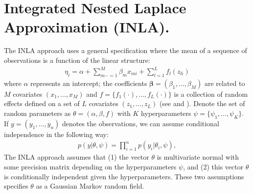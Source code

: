 \documentclass[11pt]{amsart}
\theoremstyle{plain}
\theoremstyle{definition}
\theoremstyle{remark}
\begin{document}
\section{Integrated Nested Laplace Approximation (INLA).}
\label{sec:inla}

The INLA approach uses a general specification where the mean of a sequence of
observations is a function of the linear structure:
\begin{align*}
  \eta_i = \alpha +\sum_{m-=1}^M\beta_mx_{mi}+\sum_{l=1}^Lf_l(z_{li})
\end{align*}
where $\alpha$ represents an intercept; the coefficients
$\mathbf{\beta} = (\beta_1,\ldots,\beta_M)$ are related to $M$ covariates
$(x_1,\ldots,x_M)$ and $f = \{f_1(\cdot),\ldots,f_L(\cdot)\}$ is a collection of
random effects defined on a set of $L$ covariates $(z_1,\ldots,z_L)$ (see
\cite{Rue2009} and \cite{Blangiardo2013}). Denote the set of random parameters as
$\theta = (\alpha,\beta,f)$ with $K$ hyperparameters $\psi =
\{\psi_1,\ldots,\psi_K\}$. If $y=(y_1,\ldots,y_n)$ denotes the observations, we
can assume conditional independence in the following way:
\begin{align*}
  p(y|\theta,\psi)=\prod_{i=1}^np(y_i|\theta_i,\psi),
\end{align*}
The INLA approach assumes that (1) the vector $\theta$ is multivariate normal with
some precision matrix depending on the hyperparameters $\psi$, and (2) this vector
$\theta$ is conditionally independent given the hyperparameters. These two
assumptions specifies $\theta$ as a Gaussian Markov random field.
\end{document}
